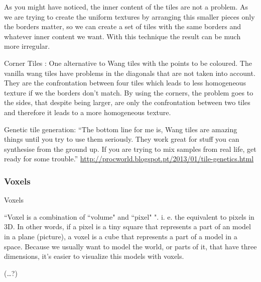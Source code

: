 As you might have noticed, the inner content of the tiles are not a problem. As we are trying to create the uniform textures by arranging this smaller pieces only the borders matter, so we can create a set of tiles with the same borders and whatever inner content we want. With this technique the result can be much more irregular. 



Corner Tiles \cite{LD06AWTCECC}:
One alternative to Wang tiles with the points to be coloured.
The vanilla wang tiles have problems in the diagonals that are not taken into account. They are the confrontation between four tiles which leads to less homogeneous texture if we the borders don't match. By using the corners, the problem goes to the sides, that despite being larger, are only the confrontation between two tiles and therefore it leads to a more homogeneous texture.

Genetic tile generation:
“The bottom line for me is, Wang tiles are amazing things until you try to use them seriously. They work great for stuff you can synthesise from the ground up. If you are trying to mix samples from real life, get ready for some trouble.”
\url{http://procworld.blogspot.pt/2013/01/tile-genetics.html}




 \subsubsection{Voxels} %
 \label{ssub:voxels}
 Voxels

``Voxel is a combination of ``volume" and ``pixel" ". i. e. the equivalent to pixels in 3D. In other words, if a pixel is a tiny square that represents a part of an model in a plane (picture), a voxel is a cube that represents a part of a model in a space.
Because we usually want to model the world, or parts of it, that have three dimensions, it's easier to visualize this models with voxels.

(\dots?)

